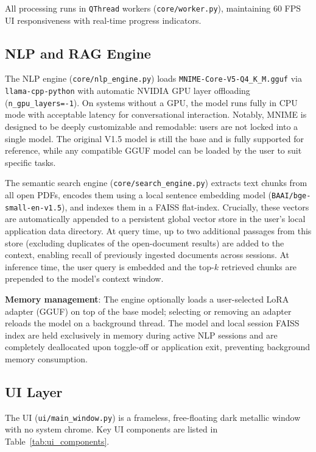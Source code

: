 \documentclass[11pt]{article}
\begin{document}
All processing runs in \texttt{QThread} workers (\texttt{core/worker.py}),
maintaining 60 FPS UI responsiveness with real-time progress indicators.

\subsection{NLP and RAG Engine}

The NLP engine (\texttt{core/nlp\_engine.py}) loads
\texttt{MNIME-Core-V5-Q4\_K\_M.gguf} via \texttt{llama-cpp-python}
with automatic NVIDIA GPU layer offloading (\texttt{n\_gpu\_layers=-1}).
On systems without a GPU, the model runs fully in CPU mode with
acceptable latency for conversational interaction. Notably, MNIME is designed to be deeply customizable and remodable: users are not locked into a single model. The original V1.5 model is still the base and is fully supported for reference, while any compatible GGUF model can be loaded by the user to suit specific tasks.

The semantic search engine (\texttt{core/search\_engine.py}) extracts
text chunks from all open PDFs, encodes them using a local sentence embedding
model (\texttt{BAAI/bge-small-en-v1.5}), and indexes them in a FAISS flat-index.
Crucially, these vectors are automatically appended to a persistent global vector store 
in the user's local application data directory. At query time, up to two additional passages 
from this store (excluding duplicates of the open-document results) are added to the context, 
enabling recall of previously ingested documents across sessions.
At inference time, the user query is embedded and the top-$k$ retrieved
chunks are prepended to the model's context window.

\textbf{Memory management}: The engine optionally loads a user-selected LoRA 
adapter (GGUF) on top of the base model; selecting or removing an adapter reloads the 
model on a background thread. The model and local session FAISS index 
are held exclusively in memory during active NLP sessions and are completely
deallocated upon toggle-off or application exit, preventing background
memory consumption.

\subsection{UI Layer}

The UI (\texttt{ui/main\_window.py}) is a frameless, free-floating dark
metallic window with no system chrome.
Key UI components are listed in Table~\ref{tab:ui_components}.
\end{document}

